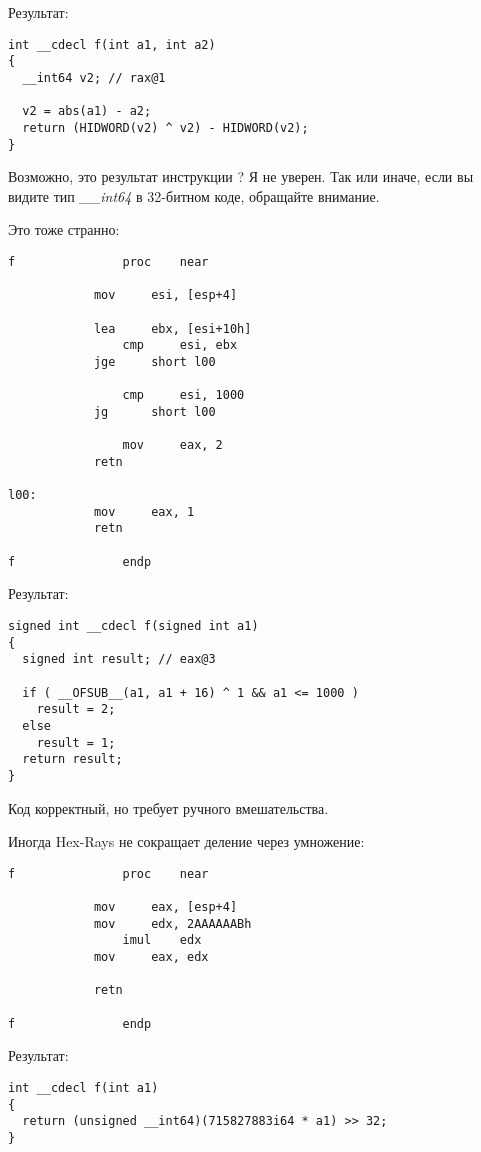 Результат:

\begin{lstlisting}[style=customc]
int __cdecl f(int a1, int a2)
{
  __int64 v2; // rax@1

  v2 = abs(a1) - a2;
  return (HIDWORD(v2) ^ v2) - HIDWORD(v2);
}
\end{lstlisting}

Возможно, это результат инструкции ? Я не уверен.
Так или иначе, если вы видите тип \emph{\_\_int64} в 32-битном коде, обращайте внимание.

Это тоже странно:

\begin{lstlisting}[style=customasmx86]
f               proc    near

	        mov     esi, [esp+4]

        	lea     ebx, [esi+10h]
                cmp     esi, ebx
	        jge     short l00

                cmp     esi, 1000
	        jg      short l00

                mov     eax, 2
	        retn

l00:
	        mov     eax, 1
        	retn

f               endp
\end{lstlisting}

Результат:

\begin{lstlisting}[style=customc]
signed int __cdecl f(signed int a1)
{
  signed int result; // eax@3

  if ( __OFSUB__(a1, a1 + 16) ^ 1 && a1 <= 1000 )
    result = 2;
  else
    result = 1;
  return result;
}
\end{lstlisting}

Код корректный, но требует ручного вмешательства.

Иногда Hex-Rays не сокращает деление через умножение:

\begin{lstlisting}[style=customasmx86]
f               proc    near

        	mov     eax, [esp+4]
	        mov     edx, 2AAAAAABh
                imul    edx
        	mov     eax, edx

	        retn

f               endp
\end{lstlisting}

Результат:

\begin{lstlisting}[style=customc]
int __cdecl f(int a1)
{
  return (unsigned __int64)(715827883i64 * a1) >> 32;
}
\end{lstlisting}

